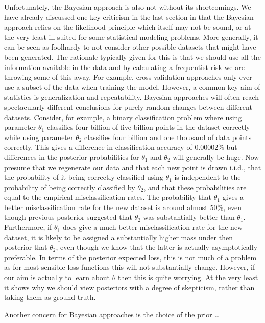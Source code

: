 Unfortunately, the Bayesian approach is also not without its shortcomings.  We have already discussed one
key criticism in the last section in that the Bayesian approach relies on the likelihood principle which itself may not
be sound, or at the very least ill-suited for some statistical modeling problems.  More generally, it can be seen as
foolhardy to not consider other possible datasets that might have been generated.  The rationale typically given for
this is that we should use all the information available in the data and by calculating a frequentist risk we are throwing
some of this away.  For example, cross-validation approaches only ever use a subset of the data when training the model.
However, a common key aim of statistics is generalization and repeatability.  Bayesian approaches will often reach
spectacularly different conclusions for purely random changes between different datasets.  Consider, for example, a binary
classification
problem where using parameter $\theta_1$ classifies four billion of five billion points in the dataset correctly 
while using parameter $\theta_2$
classifies four billion and one thousand of data points correctly.  This gives a difference in classification accuracy 
of $0.00002\%$ but differences in the posterior probabilities for $\theta_1$ and $\theta_2$ will generally
be huge.
Now presume that we regenerate our data and that each new point is drawn i.i.d.,
 that the probability of it being correctly classified using $\theta_1$ is independent to the probability of
being correctly classified by $\theta_2$, and that these probabilities are equal to the empirical misclassification
rates.  The probability that $\theta_1$ gives a better misclassification rate for the new dataset is around
almost $50\%$, even though previous posterior suggested that $\theta_2$ was substantially better than $\theta_1$.
Furthermore, if $\theta_1$ does give a much better misclassification rate for the new dataset, it is likely 
to be assigned a substantially higher mass under then posterior that $\theta_2$, even though we know that 
the latter is actually asymptotically preferable.  In terms of the posterior expected loss, this is not much of a problem
as for most sensible loss functions this will not substantially change.  However, if our aim is actually to learn 
about $\theta$ then this is quite worrying.  At the very least it shows why we should view posteriors with
a degree of skepticism, rather than taking them as ground truth.

Another concern for Bayesian approaches is the choice of the prior \dots {}

